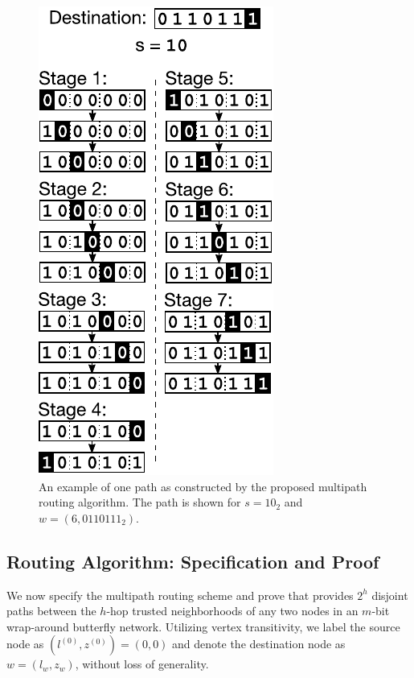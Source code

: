 \documentclass[prodmode,permissions]{acmsmall-ec16}
\begin{document}
\begin{figure}
\begin{center}
\includegraphics{fig-routing.pdf}
\end{center}
\caption{
An example of one path as constructed by the proposed multipath
routing algorithm.
The path is shown for $s = 10_2$
and $w = (6, 0110111_2)$.
\label{fig:routing}
}
\end{figure}

\subsection{Routing Algorithm: Specification and Proof}

We now specify the multipath routing scheme and prove
that provides $2^h$ disjoint paths between
the $h$-hop trusted neighborhoods of any two nodes in an $m$-bit
wrap-around butterfly network.
Utilizing vertex transitivity, we label the source node as
$(l^{(0)}, z^{(0)}) = (0, 0)$ and denote the destination node as $w = (l_w, z_w)$,
without loss of generality.
\end{document}
